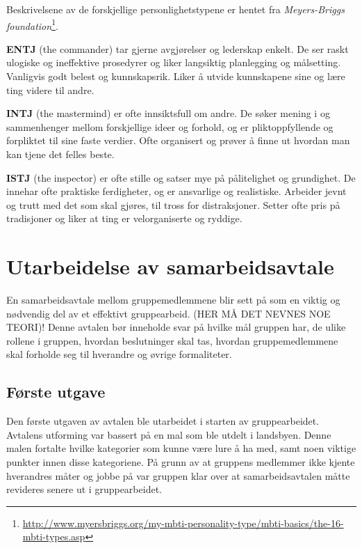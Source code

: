 Beskrivelsene av de forskjellige personlighetstypene er hentet fra \textit{Meyers-Briggs foundation}\footnote{\url{http://www.myersbriggs.org/my-mbti-personality-type/mbti-basics/the-16-mbti-types.asp}}.
\vspace{\secspace}

\textbf{ENTJ} (the commander) tar gjerne avgjørelser og lederskap enkelt. 
De ser raskt ulogiske og ineffektive prosedyrer og liker langsiktig planlegging og målsetting. 
Vanligvis godt belest og kunnskapsrik. 
Liker å utvide kunnskapene sine og lære ting videre til andre. 
\vspace{\secspace}

\textbf{INTJ} (the mastermind) er ofte innsiktsfull om andre. 
De søker mening i og sammenhenger mellom forskjellige ideer og forhold, og er pliktoppfyllende og forpliktet til sine faste verdier. 
Ofte organisert og prøver å finne ut hvordan man kan tjene det felles beste. 

\textbf{ISTJ} (the inspector) er ofte stille og satser mye på pålitelighet og grundighet. 
De innehar ofte praktiske ferdigheter, og er ansvarlige og realistiske. 
Arbeider jevnt og trutt med det som skal gjøres, til tross for distraksjoner. 
Setter ofte pris på tradisjoner og liker at ting er velorganiserte og ryddige. 

\section{Utarbeidelse av samarbeidsavtale}
En samarbeidsavtale mellom gruppemedlemmene blir sett på som en viktig og nødvendig del av et effektivt gruppearbeid. 
(HER MÅ DET NEVNES NOE TEORI)!
Denne avtalen bør inneholde svar på hvilke mål gruppen har, de ulike rollene i gruppen, hvordan beslutninger skal tas, hvordan gruppemedlemmene skal forholde seg til hverandre og øvrige formaliteter. 

\subsection{Første utgave}
Den første utgaven av avtalen ble utarbeidet i starten av gruppearbeidet. 
Avtalens utforming var bassert på en mal som ble utdelt i landsbyen. 
Denne malen fortalte hvilke kategorier som kunne være lure å ha med, samt noen viktige punkter innen disse kategoriene. 
På grunn av at gruppens medlemmer ikke kjente hverandres måter og jobbe på var gruppen klar over at samarbeidsavtalen måtte revideres senere ut i gruppearbeidet. 
\vspace{\secspace}

